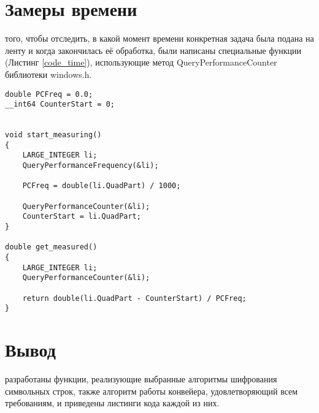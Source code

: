 \section{Замеры времени}
 того, чтобы отследить, в какой момент времени конкретная задача была подана на ленту и когда закончилась её обработка, были написаны специальные функции (Листинг \ref{code_time}), использующие метод QueryPerformanceCounter библиотеки windows.h.  \cite{Query}

\begin{lstlisting}[label=code_time, caption = Работа со временем]
double PCFreq = 0.0;
__int64 CounterStart = 0;


void start_measuring()
{
	LARGE_INTEGER li;
	QueryPerformanceFrequency(&li);
	
	PCFreq = double(li.QuadPart) / 1000;
	
	QueryPerformanceCounter(&li);
	CounterStart = li.QuadPart;
}

double get_measured()
{
	LARGE_INTEGER li;
	QueryPerformanceCounter(&li);
	
	return double(li.QuadPart - CounterStart) / PCFreq;
}
\end{lstlisting}

\section*{Вывод}
 разработаны функции, реализующие выбранные алгоритмы шифрования символьных строк, также алгоритм работы конвейера, удовлетворяющий всем требованиям, и приведены листинги кода каждой из них.

